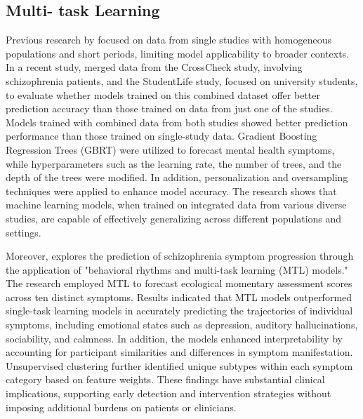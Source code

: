 \subsection{Multi- task Learning}
Previous research by \citet{adler2020predicting} focused on data from single studies with homogeneous populations and short periods, limiting model applicability to broader contexts. In a recent study, \citet{adler2022machine} merged data from the CrossCheck study, involving schizophrenia patients, and the StudentLife study, focused on university students, to evaluate whether models trained on this combined dataset offer better prediction accuracy than those trained on data from just one of the studies. Models trained with combined data from both studies showed better prediction performance than those trained on single-study data. Gradient Boosting Regression Trees (GBRT) were utilized to forecast mental health symptoms, while hyperparameters such as the learning rate, the number of trees, and the depth of the trees were modified. In addition, personalization and oversampling techniques were applied to enhance model accuracy. The research shows that machine learning models, when trained on integrated data from various diverse studies, are capable of effectively generalizing across different populations and settings.

Moreover, \citet{tseng2020using} explores the prediction of schizophrenia symptom progression through the application of "behavioral rhythms and multi-task learning (MTL) models." The research employed MTL to forecast ecological momentary assessment scores across ten distinct symptoms. Results indicated that MTL models outperformed single-task learning models in accurately predicting the trajectories of individual symptoms, including emotional states such as depression, auditory hallucinations, sociability, and calmness. In addition, the models enhanced interpretability by accounting for participant similarities and differences in symptom manifestation. Unsupervised clustering further identified unique subtypes within each symptom category based on feature weights. These findings have substantial clinical implications, supporting early detection and intervention strategies without imposing additional burdens on patients or clinicians.

